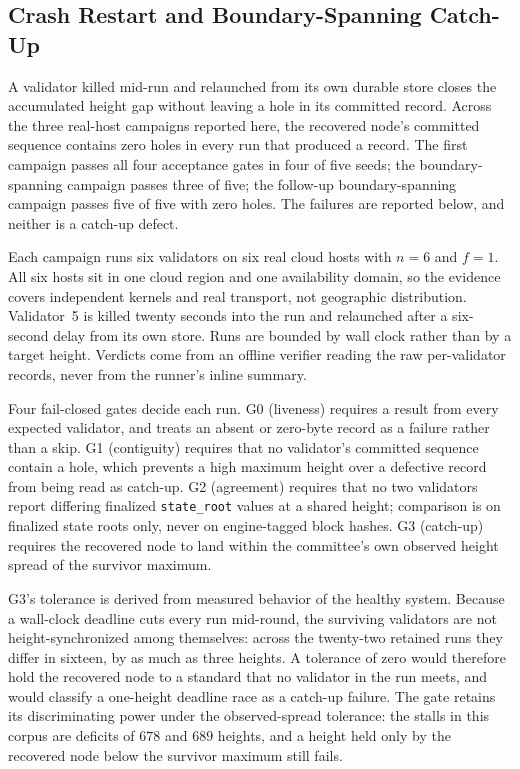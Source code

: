 \documentclass[journal]{IEEEtran}
\theoremstyle{definition}
\theoremstyle{remark}
\begin{document}
\subsection{Crash Restart and Boundary-Spanning Catch-Up}
\label{sec:crash-recovery}
A validator killed mid-run and relaunched from its own durable store closes the accumulated height
gap without leaving a hole in its committed record. Across the three real-host campaigns reported
here, the recovered node's committed sequence contains zero holes in every run that produced a
record. The first campaign passes all four acceptance gates in four of five seeds; the
boundary-spanning campaign passes three of five; the follow-up boundary-spanning campaign passes
five of five with zero holes. The failures are reported below, and neither is a catch-up defect.

Each campaign runs six validators on six real cloud hosts with $n=6$ and $f=1$. All six hosts sit in
one cloud region and one availability domain, so the evidence covers independent kernels and real
transport, not geographic distribution. Validator~5 is killed twenty seconds into the run and
relaunched after a six-second delay from its own store. Runs are bounded by wall clock rather than by
a target height. Verdicts come from an offline verifier reading the raw per-validator records, never
from the runner's inline summary.

Four fail-closed gates decide each run. G0 (liveness) requires a result from every expected
validator, and treats an absent or zero-byte record as a failure rather than a skip. G1 (contiguity)
requires that no validator's committed sequence contain a hole, which prevents a high maximum height
over a defective record from being read as catch-up. G2 (agreement) requires that no two validators
report differing finalized \texttt{state\_root} values at a shared height; comparison is on finalized
state roots only, never on engine-tagged block hashes. G3 (catch-up) requires the recovered node to
land within the committee's own observed height spread of the survivor maximum.

G3's tolerance is derived from measured behavior of the healthy system. Because a wall-clock deadline
cuts every run mid-round, the surviving validators are not height-synchronized among themselves:
across the twenty-two retained runs they differ in sixteen, by as much as three heights. A tolerance
of zero would therefore hold the recovered node to a standard that no validator in the run meets, and
would classify a one-height deadline race as a catch-up failure. The gate retains its discriminating
power under the observed-spread tolerance: the stalls in this corpus are deficits of $678$ and $689$
heights, and a height held only by the recovered node below the survivor maximum still fails.
\end{document}
